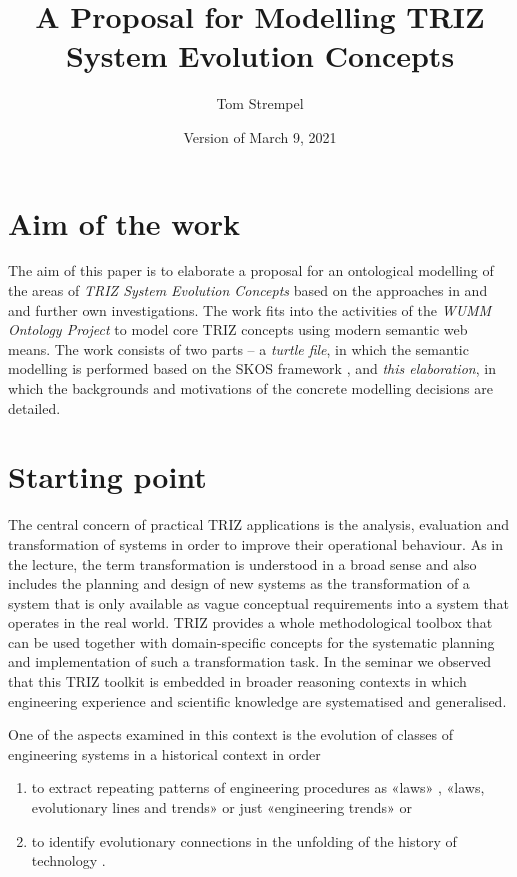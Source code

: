 \documentclass[11pt,a4paper]{article}
\title{A Proposal for Modelling TRIZ System Evolution Concepts}
\author{Tom Strempel}
\date{Version of March 9, 2021}
\begin{document}
\maketitle

\section{Aim of the work}

The aim of this paper is to elaborate a proposal for an ontological modelling
of the areas of \emph{TRIZ System Evolution Concepts} based on the approaches
in \cite{TESE2018} and \cite{Shpakovsky2016} and further own investigations.
The work fits into the activities of the \emph{WUMM Ontology Project}
\cite{WUMM} to model core TRIZ concepts using modern semantic web means.  The
work consists of two parts -- a \emph{turtle file}, in which the semantic
modelling is performed based on the SKOS framework \cite{SKOS}, and \emph{this
  elaboration}, in which the backgrounds and motivations of the concrete
modelling decisions are detailed.

\section{Starting point} 

The central concern of practical TRIZ applications is the analysis, evaluation
and transformation of systems in order to improve their operational behaviour.
As in the lecture, the term transformation is understood in a broad sense and
also includes the planning and design of new systems as the transformation of
a system that is only available as vague conceptual requirements into a system
that operates in the real world. TRIZ provides a whole methodological toolbox
that can be used together with domain-specific concepts for the systematic
planning and implementation of such a transformation task. In the seminar we
observed that this TRIZ toolkit is embedded in broader reasoning contexts in
which engineering experience and scientific knowledge are systematised and
generalised.

One of the aspects examined in this context is the evolution of classes of
engineering systems in a historical context in order 
\begin{enumerate}
\item to extract repeating patterns of engineering procedures as «laws»
  \cite{Altshuller1979}, «laws, evolutionary lines and trends» \cite{KS} or
  just «engineering trends» \cite{TESE2018} or
\item to identify evolutionary connections in the unfolding of the history of
  technology \cite{Shpakovsky2016}.
\end{enumerate}
\end{document}
